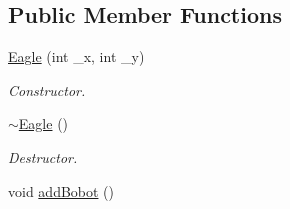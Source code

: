 \subsection*{Public Member Functions}
\begin{DoxyCompactItemize}
\item 
\hyperlink{classEagle_abcdafbd20745ef82b612ca4839f221ec}{Eagle} (int \-\_\-x, int \-\_\-y)
\begin{DoxyCompactList}\small\item\em Constructor. \end{DoxyCompactList}\item 
\hypertarget{classEagle_a192a898182736506c1f78159bf3477b7}{\hyperlink{classEagle_a192a898182736506c1f78159bf3477b7}{$\sim$\-Eagle} ()}\label{classEagle_a192a898182736506c1f78159bf3477b7}

\begin{DoxyCompactList}\small\item\em Destructor. \end{DoxyCompactList}\item 
\hypertarget{classEagle_a59a6326f2e7a63a1d0d724d37402652d}{void \hyperlink{classEagle_a59a6326f2e7a63a1d0d724d37402652d}{add\-Bobot} ()}\label{classEagle_a59a6326f2e7a63a1d0d724d37402652d}


\end{DoxyCompactItemize}
